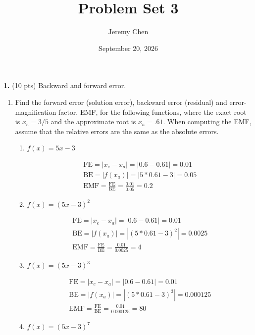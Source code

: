 \documentclass[10pt,letterpaper]{article}
\title{Problem Set 3}
\author{Jeremy Chen}
\date{September 20, 2026}
\begin{document}
	\maketitle

\noindent\textbf{1.} (10 pts) Backward and forward error. 

\begin{enumerate}

\item  Find the forward error (solution error), backward error (residual) and error-magnification factor, EMF, for the following functions, where the exact root is $x_{e} = 3/5$ and the approximate root is $x_{a} = .61$. When computing the EMF, assume that the relative errors are the same as the absolute errors.

\begin{enumerate}[1. ]

\item $f(x) = 5x - 3$

\color{TangGreen}
\begin{gather*}
\text{FE} = |x_{e} - x_{a}| = |0.6 - 0.61| = 0.01 \\
\text{BE} = |f(x_{a})| = |5 * 0.61 - 3| = 0.05 \\
\text{EMF} = \frac{\text{FE}}{\text{BE}} = \frac{0.01}{0.05} = 0.2
\end{gather*}
\color{black}

\item $f(x) = (5x - 3)^{2}$

\color{TangGreen}
\begin{gather*}
\text{FE} = |x_{e} - x_{a}| = |0.6 - 0.61| = 0.01 \\
\text{BE} = |f(x_{a})| = |(5 * 0.61 - 3)^{2}| = 0.0025 \\
\text{EMF} = \frac{\text{FE}}{\text{BE}} = \frac{0.01}{0.0025} = 4
\end{gather*}
\color{black}

\item $f(x) = (5x - 3)^{3}$

\color{TangGreen}
\begin{gather*}
\text{FE} = |x_{e} - x_{a}| = |0.6 - 0.61| = 0.01 \\
\text{BE} = |f(x_{a})| = |(5 * 0.61 - 3)^{3}| = 0.000125 \\
\text{EMF} = \frac{\text{FE}}{\text{BE}} = \frac{0.01}{0.000125} = 80
\end{gather*}
\color{black}

\item $f(x) = (5x - 3)^{7}$


\end{enumerate}
\end{enumerate}
\end{document}
